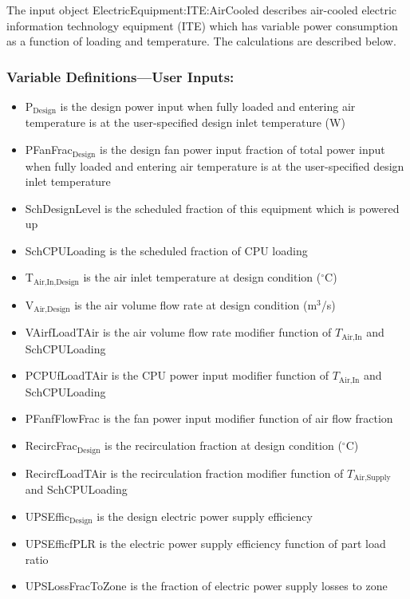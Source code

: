 The input object ElectricEquipment:ITE:AirCooled describes air-cooled electric information technology equipment (ITE) which has variable power consumption as a function of loading and temperature. The calculations are described below.

\subsubsection{Variable Definitions---User Inputs:}\label{variable-definitions-user-inputs}

\begin{itemize}
\tightlist
\item
  P$_\textrm{Design}$ is the design power input when fully loaded and entering air temperature is at the user-specified design inlet temperature (W)
\item
  PFanFrac$_\textrm{Design}$ is the design fan power input fraction of total power input when fully loaded and entering air temperature is at the user-specified design inlet temperature
\item
  SchDesignLevel is the scheduled fraction of this equipment which is powered up
\item
  SchCPULoading is the scheduled fraction of CPU loading
\item
  T$_\textrm{Air,In,Design}$ is the air inlet temperature at design condition ($^\circ$C)
\item
  V$_\textrm{Air,Design}$ is the air volume flow rate at design condition (m$^3$/s)
\item
  VAirfLoadTAir is the air volume flow rate modifier function of  $T_{\textrm{Air,In}}$ and SchCPULoading
\item
  PCPUfLoadTAir is the CPU power input modifier function of $T_{\textrm{Air,In}}$ and SchCPULoading
\item
  PFanfFlowFrac is the fan power input modifier function of air flow fraction
\item
  RecircFrac$_\textrm{Design}$ is the recirculation fraction at design condition ($^\circ$C)
\item
  RecircfLoadTAir is the recirculation fraction modifier function of  $T_{\textrm{Air,Supply}}$ and SchCPULoading
\item
  UPSEffic$_\textrm{Design}$ is the design electric power supply efficiency
\item
  UPSEfficfPLR is the electric power supply efficiency function of part load ratio
\item
  UPSLossFracToZone is the fraction of electric power supply losses to zone
\end{itemize}

